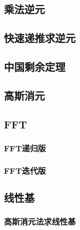 \documentclass[10pt,a4paper]{article}
\begin{document}
\subsection{乘法逆元}
\begin{spacing}{1.5}

\end{spacing}

\subsection{快速递推求逆元}
\begin{spacing}{1.5}

\end{spacing}

\subsection{中国剩余定理}
\begin{spacing}{1.5}

\end{spacing}

\subsection{高斯消元}
\begin{spacing}{1.5}

\end{spacing}

\subsection{FFT}
\subsubsection{FFT递归版}

\subsubsection{FFT迭代版}

\subsection{线性基}
\subsubsection{高斯消元法求线性基}
\begin{spacing}{1.5}

\end{spacing}

\end{document}
